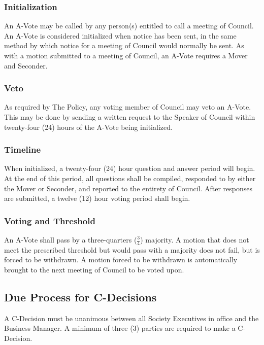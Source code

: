 \subsubsection{Initialization}
An A-Vote may be called by any person(s) entitled to call a meeting of Council.  An A-Vote is considered 
initialized when notice has been sent, in the same method by which notice for a meeting of Council would 
normally be sent. As with a motion submitted to a meeting of Council, an A-Vote requires a Mover and 
Seconder.

\subsubsection{Veto}
As required by The Policy, any voting member of Council may veto an A-Vote.  This may be done by 
sending a written request to the Speaker of Council within twenty-four (24) hours of the A-Vote being 
initialized.

\subsubsection{Timeline}
When initialized, a twenty-four (24) hour question and answer period will begin.  At the end of this 
period, all questions shall be compiled, responded to by either the Mover or Seconder, and reported to the entirety of Council. After responses are submitted, a twelve (12) hour voting period shall begin.

\subsubsection{Voting and Threshold}
An A-Vote shall pass by a three-quarters ($\frac{3}{4}$) majority.  A motion that does not meet the prescribed 
threshold but would pass with a majority does not fail, but is forced to be withdrawn.  A motion 
forced to be withdrawn is automatically brought to the next meeting of Council to be voted upon.

\subsection{Due Process for C-Decisions}
A C-Decision must be unanimous between all Society Executives in office and the Business Manager.  A 
minimum of three (3) parties are required to make a C-Decision.
